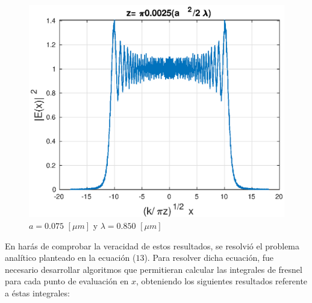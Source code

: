 \documentclass[11pt,letterpaper,twocolumn]{article}
\begin{document}
\begin{figure}[h!]
\begin{center}
\includegraphics[scale=0.55]{p1.eps}
\caption{$a=0.075$ $[\mu m]$ y $\lambda=0.850$ $[\mu m]$}
\end{center}
\label{pos}
\end{figure} 
\par 
En harás de comprobar la veracidad de estos resultados, se resolvió el problema analítico planteado en la ecuación ($13$). Para resolver dicha ecuación, fue necesario desarrollar algoritmos que permitieran calcular las integrales de fresnel para cada punto de evaluación en $x$, obteniendo los siguientes resultados referente a éstas integrales:
\end{document}
